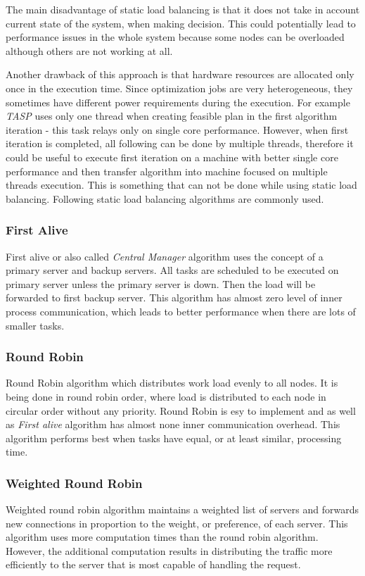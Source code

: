 The main disadvantage of static load balancing is that it does not take in account current state of the system, when making decision.
This could potentially lead to performance issues in the whole system because some nodes can be overloaded although others are not working at all.

Another drawback of this approach is that hardware resources are allocated only once in the execution time.
Since optimization jobs are very heterogeneous, they sometimes have different power requirements during the execution.
For example \textit{TASP} uses only one thread when creating feasible plan in the first algorithm iteration -
this task relays only on single core performance.
However, when first iteration is completed, all following can be done by multiple threads,
therefore it could be useful to execute first iteration on a machine with better single core performance
and then transfer algorithm into machine focused on multiple threads execution.
This is something that can not be done while using static load balancing.\newline
Following static load balancing algorithms are commonly used.

\subsubsection{First Alive}
First alive or also called \textit{Central Manager} algorithm uses the concept of a primary server and backup servers\cite{web:ibmLoadBalancingDecisions}.
All tasks are scheduled to be executed on primary server unless the primary server is down.
Then the load will be forwarded to first backup server.
This algorithm has almost zero level of inner process communication, which leads to better performance when there are lots of smaller tasks.

\subsubsection{Round Robin}
Round Robin algorithm which distributes work load evenly to all nodes.
It is being done in round robin order, where load is distributed to each node in circular order without any priority.
Round Robin is esy to implement and as well as \textit{First alive} algorithm has almost none inner communication overhead.
This algorithm performs best when tasks have equal, or at least similar, processing time.

\subsubsection{Weighted Round Robin}
Weighted round robin algorithm maintains a weighted list of servers and forwards new connections in proportion to the weight, or preference,
of each server.
This algorithm uses more computation times than the round robin algorithm.
However, the additional computation results in distributing the traffic more efficiently to the server that is most capable of handling the request\cite{web:ibmLoadBalancingDecisions}.

